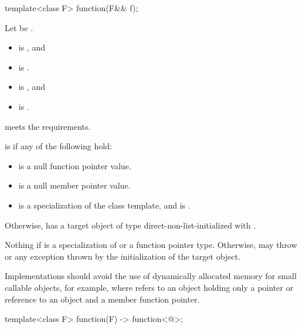 %
\begin{itemdecl}
template<class F> function(F&& f);
\end{itemdecl}

\begin{itemdescr}
\pnum
Let  be .

\pnum
\constraints
\begin{itemize}
\item
{} is , and
\item
{} is .
\end{itemize}

\pnum
\mandates
\begin{itemize}
\item
{} is , and
\item
{} is .
\end{itemize}

\pnum
\expects
{} meets the  requirements.

\pnum
\ensures
{} is  if any of the following hold:
\begin{itemize}
\item {} is a null function pointer value.
\item {} is a null member pointer value.
\item {} is
a specialization of the  class template, and
 is .
\end{itemize}

\pnum
Otherwise,  has a target object of type 
direct-non-list-initialized with .

\pnum
\throws
Nothing if  is
a specialization of  or
a function pointer type.
Otherwise, may throw  or
any exception thrown by the initialization of the target object.

\pnum
\recommended
Implementations should avoid the use of
dynamically allocated memory for small callable objects, for example,
where  refers to an object holding only a pointer or
reference to an object and a member function pointer.
\end{itemdescr}


\begin{itemdecl}
template<class F> function(F) -> function<@\seebelow@>;
\end{itemdecl}


